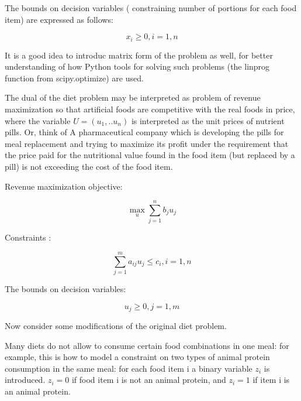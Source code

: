 {{{The bounds on decision variables ( constraining number of portions for each food item) are expressed as follows:

   \begin{equation} %
    x_i\ge 0, i=1,n
    \end{equation}

It is a good idea to introduc matrix form of the problem as well, for better understanding of how  Python tools for solving such problems (the linprog function from scipy.optimize) are used.

The dual of the diet problem may be interpreted as problem of revenue maximization so that artificial foods are competitive with the real foods in price, where the variable $U=(u_1,..u_n )$ is interpreted as the unit prices of nutrient pills. 
Or, think of A pharmaceutical company which is developing the pills for meal replacement and  trying to maximize its profit under the requirement that the price paid for the nutritional value found in the food item (but replaced by a pill) is not exceeding the cost of the food item.

Revenue maximization objective:

    \begin{equation} %
   \max_u \sum_{j=1}^{n}{b_ju_j}
    \end{equation}

Constraints :

   \begin{equation} %
    \sum_{j=1}^{m}{a_{ij}u_j}\le c_i, i=1,n
    \end{equation}

The bounds on decision variables:

   \begin{equation} %
    u_j\ge 0, j=1,m
    \end{equation}


Now consider some modifications of the original diet problem. 

Many diets do not allow to consume certain food combinations in one meal: for example, this is how to model a constraint on two types of animal protein consumption in the same meal: for each food item i a binary variable $ z_i$ is introduced.  $z_i=0$ if food item i is not an animal protein, and $ z_i=1$ if item i is an animal protein.

}}}
